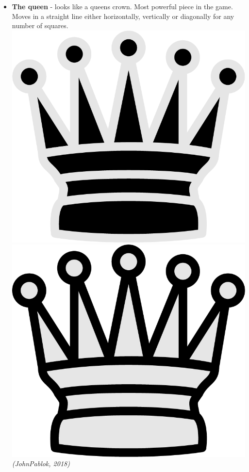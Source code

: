 \documentclass{article}
\begin{document}
\begin{itemize}
    \item \textbf{The queen} - looks like a queens crown. Most powerful piece in the game. Moves in a straight line either horizontally, vertically or diagonally for any number of squares.\\
    \includegraphics[scale=0.1]{image14.png}
    \includegraphics[scale=0.1]{image4.png}
    \textit{(JohnPablok, 2018)}
    

\end{itemize}
\end{document}
